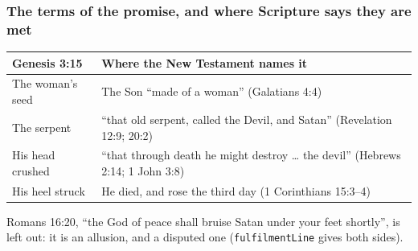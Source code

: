 \documentclass[11pt]{article}
\begin{document}
\subsubsection*{The terms of the promise, and where Scripture says they are met}
\begin{longtable}{@{}>{\raggedright\arraybackslash}p{} >{\raggedright\arraybackslash}p{}@{}}
\toprule
\textbf{Genesis 3:15} & \textbf{Where the New Testament names it} \\
\midrule
\endhead
The woman’s seed & The Son “made of a woman” (Galatians 4:4) \\
The serpent & “that old serpent, called the Devil, and Satan” (Revelation 12:9; 20:2) \\
His head crushed & “that through death he might destroy … the devil” (Hebrews 2:14; 1 John 3:8) \\
His heel struck & He died, and rose the third day (1 Corinthians 15:3–4) \\
\bottomrule
\end{longtable}
Romans 16:20, “the God of peace shall bruise Satan under your feet shortly”, is left out: it is an allusion, and a disputed one (\texttt{fulfilment\allowbreak{}Line} gives both sides).
\end{document}
